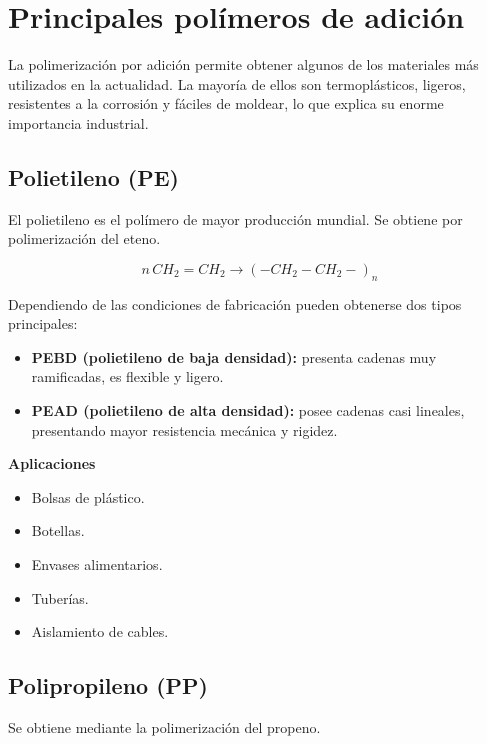 \section{Principales polímeros de adición}

La polimerización por adición permite obtener algunos de los materiales más utilizados
en la actualidad. La mayoría de ellos son termoplásticos, ligeros, resistentes a la
corrosión y fáciles de moldear, lo que explica su enorme importancia industrial.


\subsection{Polietileno (PE)}

El polietileno es el polímero de mayor producción mundial. Se obtiene por
polimerización del eteno.

\[
n\,CH_2=CH_2
\longrightarrow
(-CH_2-CH_2-)_n
\]

Dependiendo de las condiciones de fabricación pueden obtenerse dos tipos principales:

\begin{itemize}
\item \textbf{PEBD (polietileno de baja densidad):} presenta cadenas muy ramificadas,
es flexible y ligero.
\item \textbf{PEAD (polietileno de alta densidad):} posee cadenas casi lineales,
presentando mayor resistencia mecánica y rigidez.
\end{itemize}

\textbf{Aplicaciones}

\begin{itemize}
\item Bolsas de plástico.
\item Botellas.
\item Envases alimentarios.
\item Tuberías.
\item Aislamiento de cables.
\end{itemize}


\subsection{Polipropileno (PP)}

Se obtiene mediante la polimerización del propeno.

